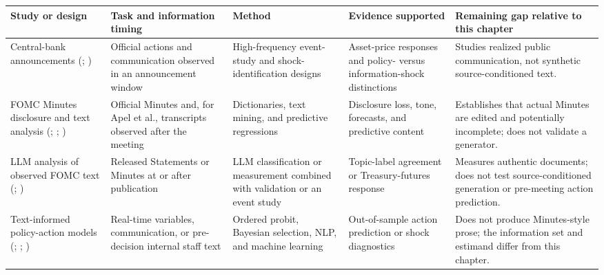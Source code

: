 \begin{table}[htbp]
    \centering
    \footnotesize
    \setlength{\tabcolsep}{3pt}
    \renewcommand{\arraystretch}{1.18}
    \begin{tabularx}{\textwidth}{@{}
        >{\raggedright\arraybackslash}p{}
        >{\raggedright\arraybackslash}p{}
        >{\raggedright\arraybackslash}p{}
        >{\raggedright\arraybackslash}p{}
        >{\raggedright\arraybackslash}X@{}}
        \toprule
        \textbf{Study or design} & \textbf{Task and information timing} &
        \textbf{Method} & \textbf{Evidence supported} &
        \textbf{Remaining gap relative to this chapter} \\
        \midrule
        Central-bank announcements
        (\cite{gurkaynak2005actions}; \cite{nakamura2018information})
        & Official actions and communication observed in an announcement
        window
        & High-frequency event-study and shock-identification designs
        & Asset-price responses and policy- versus information-shock
        distinctions
        & Studies realized public communication, not synthetic
        source-conditioned text. \\

        FOMC Minutes disclosure and text analysis
        (\cite{apel2022disclosure}; \cite{huang2021economic};
        \cite{tadle2022fomc})
        & Official Minutes and, for Apel et al., transcripts observed after
        the meeting
        & Dictionaries, text mining, and predictive regressions
        & Disclosure loss, tone, forecasts, and predictive content
        & Establishes that actual Minutes are edited and potentially
        incomplete; does not validate a generator. \\

        LLM analysis of observed FOMC text
        (\cite{dunn2024using}; \cite{chen2026decoding})
        & Released Statements or Minutes at or after publication
        & LLM classification or measurement combined with validation or an
        event study
        & Topic-label agreement or Treasury-futures response
        & Measures authentic documents; does not test source-conditioned
        generation or pre-meeting action prediction. \\

        Text-informed policy-action models
        (\cite{hayo2010federal}; \cite{vandendhauwe2013bayesian};
        \cite{aruoba2024identifying})
        & Real-time variables, communication, or pre-decision internal staff
        text
        & Ordered probit, Bayesian selection, NLP, and machine learning
        & Out-of-sample action prediction or shock diagnostics
        & Does not produce Minutes-style prose; the information set and
        estimand differ from this chapter. \\


\end{tabularx}
\end{table}
